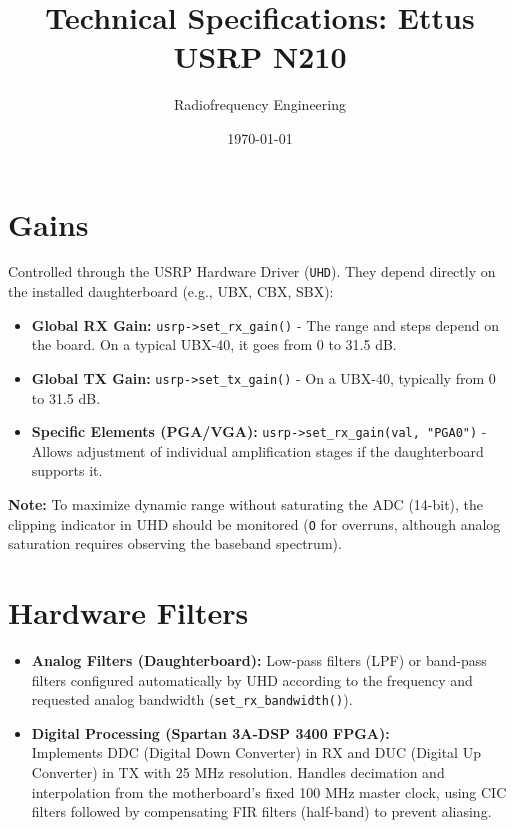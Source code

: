 \documentclass[11pt]{article}
\title{Technical Specifications: Ettus USRP N210}
\author{Radiofrequency Engineering}
\date{\today}
\begin{document}
\maketitle
\tableofcontents
\newpage

\section{Gains}

Controlled through the USRP Hardware Driver (\texttt{UHD}). They depend directly on the installed daughterboard (e.g., UBX, CBX, SBX):

\begin{itemize}
    \item \textbf{Global RX Gain:} \texttt{usrp->set\_rx\_gain()} - The range and steps depend on the board. On a typical UBX-40, it goes from 0 to 31.5 dB.
    \item \textbf{Global TX Gain:} \texttt{usrp->set\_tx\_gain()} - On a UBX-40, typically from 0 to 31.5 dB.
    \item \textbf{Specific Elements (PGA/VGA):} \texttt{usrp->set\_rx\_gain(val, "PGA0")} - Allows adjustment of individual amplification stages if the daughterboard supports it.
\end{itemize}

\textbf{Note:} To maximize dynamic range without saturating the ADC (14-bit), the clipping indicator in UHD should be monitored (\texttt{O} for overruns, although analog saturation requires observing the baseband spectrum).

\section{Hardware Filters}

\begin{itemize}
    \item \textbf{Analog Filters (Daughterboard):} Low-pass filters (LPF) or band-pass filters configured automatically by UHD according to the frequency and requested analog bandwidth (\texttt{set\_rx\_bandwidth()}).
    \item \textbf{Digital Processing (Spartan 3A-DSP 3400 FPGA):}\\
    Implements DDC (Digital Down Converter) in RX and DUC (Digital Up Converter) in TX with 25 MHz resolution. Handles decimation and interpolation from the motherboard's fixed 100 MHz master clock, using CIC filters followed by compensating FIR filters (half-band) to prevent aliasing.
\end{itemize}
\end{document}
